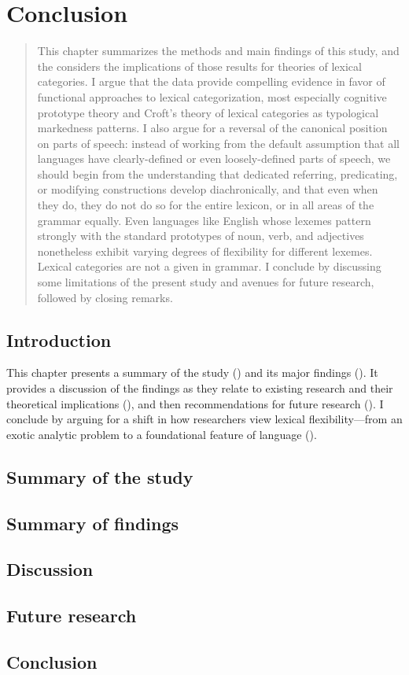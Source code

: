 \chapter{Conclusion}
\label{ch:conclusion}

\blockquote{This chapter summarizes the methods and main findings of this study, and the considers the implications of those results for theories of lexical categories. I argue that the data provide compelling evidence in favor of functional approaches to lexical categorization, most especially cognitive prototype theory and Croft's theory of lexical categories as typological markedness patterns. I also argue for a reversal of the canonical position on parts of speech: instead of working from the default assumption that all languages have clearly-defined or even loosely-defined parts of speech, we should begin from the understanding that dedicated referring, predicating, or modifying constructions develop diachronically, and that even when they do, they do not do so for the entire lexicon, or in all areas of the grammar equally. Even languages like English whose lexemes pattern strongly with the standard prototypes of noun, verb, and adjectives nonetheless exhibit varying degrees of flexibility for different lexemes. Lexical categories are not a given in grammar. I conclude by discussing some limitations of the present study and avenues for future research, followed by closing remarks.}

\section{Introduction}
\label{sec:5.1}

This chapter presents a summary of the study () and its major findings (). It provides a discussion of the findings as they relate to existing research and their theoretical implications (), and then recommendations for future research (). I conclude by arguing for a shift in how researchers view lexical flexibility—from an exotic analytic problem to a foundational feature of language ().

\section{Summary of the study}
\label{sec:5.2}

\section{Summary of findings}
\label{sec:5.3}

\section{Discussion}
\label{sec:5.4}

\section{Future research}
\label{sec:5.5}

\section{Conclusion}
\label{sec:5.6}
